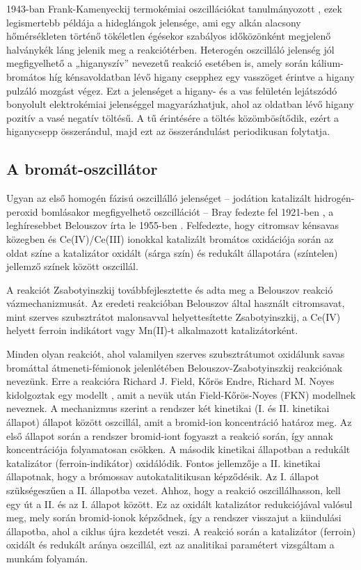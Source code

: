 1943-ban Frank-Kamenyeckij termokémiai oszcillációkat tanulmányozott \cite{frank1943nikov}, ezek legismertebb példája a hideglángok jelensége, ami egy alkán alacsony hőmérsékleten történő tökéletlen égésekor szabályos időközönként megjelenő halványkék láng jelenik meg a reakciótérben.
Heterogén oszcilláló jelenség jól megfigyelhető a „higanyszív” nevezetű reakció esetében is, amely során kálium-bromátos híg kénsavoldatban lévő higany csepphez egy vasszöget érintve a higany pulzáló mozgást végez. Ezt a jelenséget a higany- és a vas felületén lejátszódó bonyolult elektrokémiai jelenséggel magyarázhatjuk, ahol az oldatban lévő higany pozitív a vasé negatív töltésű. A tű érintésére a töltés közömbösítődik, ezért a higanycsepp összerándul, majd ezt az összerándulást periodikusan folytatja.

\subsection{A bromát-oszcillátor} \label{bromatoszcillator}
Ugyan az első homogén fázisú oszcillálló jelenséget -- jodátion katalizált hidrogén-peroxid bomlásakor megfigyelhető oszcillációt -- Bray fedezte fel 1921-ben \cite{bray1921periodic}, a leghíresebbet Belouszov írta le 1955-ben \cite{belousov1959collection}. Felfedezte, hogy citromsav kénsavas közegben és Ce(IV)/Ce(III) ionokkal katalizált bromátos oxidációja során az oldat színe a katalizátor oxidált (sárga szín) és redukált állapotára (színtelen) jellemző színek között oszcillál.

A reakciót Zsabotyinszkij továbbfejlesztette \cite{zhabotinsky1964periodical} és adta meg a Belouszov reakció vázmechanizmusát. Az eredeti reakcióban Belouszov által használt citromsavat, mint szerves szubsztrátot malonsavval helyettesítette Zsabotyinszkij, a Ce(IV) helyett ferroin indikátort vagy Mn(II)-t alkalmazott katalizátorként.

Minden olyan reakciót, ahol valamilyen szerves szubsztrátumot oxidálunk savas bromáttal átmeneti-fémionok jelenlétében Belouszov-Zsabotyinszkij reakciónak nevezünk. Erre a reakcióra Richard J. Field, Kőrös Endre, Richard M. Noyes kidolgoztak egy modellt \cite{noyes1972oscillations}, amit a nevük után Field-Kőrös-Noyes (FKN) modellnek neveznek. A mechanizmus szerint a rendszer két kinetikai (I. és II. kinetikai állapot) állapot között oszcillál, amit a bromid-ion koncentráció határoz meg.
Az első állapot során a rendszer bromid-iont fogyaszt a reakció során, így annak koncentrációja folyamatosan csökken. A második kinetikai állapotban a redukált katalizátor (ferroin-indikátor) oxidálódik. Fontos jellemzője a II. kinetikai állapotnak, hogy a brómossav autokatalitikusan képződésik. Az I. állapot szükségeszűen a II. állapotba vezet. Ahhoz, hogy a reakció oszcillálhasson, kell egy út a II. és az I. állapot között. Ez az oxidált katalizátor redukciójával valósul meg, mely során bromid-ionok képződnek, így a rendszer visszajut a kiindulási állapotba, ahol a ciklus újra kezdetét veszi. A reakció során a katalizátor (ferroin) oxidált és redukált aránya oszcillál, ezt az analitikai paramétert vizsgáltam a munkám folyamán.


